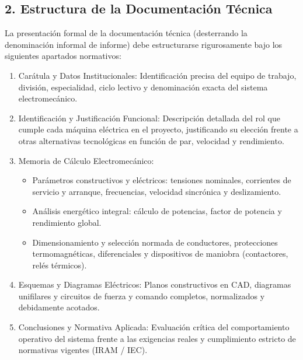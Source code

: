 \documentclass[../main]{subfiles}
\begin{document}
\subsection{2. Estructura de la Documentación Técnica}
La presentación formal de la documentación técnica (desterrando la
denominación informal de informe) debe estructurarse rigurosamente
bajo los siguientes apartados normativos:
\begin{enumerate}
  \item Carátula y Datos Institucionales: Identificación precisa del
    equipo de trabajo, división, especialidad, ciclo lectivo y
    denominación exacta del sistema electromecánico.
  \item Identificación y Justificación Funcional: Descripción
    detallada del rol que cumple cada máquina eléctrica en el
    proyecto, justificando su elección frente a otras alternativas
    tecnológicas en función de par, velocidad y rendimiento.
  \item Memoria de Cálculo Electromecánico:
    \begin{itemize}
      \item Parámetros constructivos y eléctricos: tensiones
        nominales, corrientes de servicio y arranque, frecuencias,
        velocidad sincrónica y deslizamiento.
      \item Análisis energético integral: cálculo de potencias,
        factor de potencia y rendimiento global.
      \item Dimensionamiento y selección normada de conductores,
        protecciones termomagnéticas, diferenciales y dispositivos de
        maniobra (contactores, relés térmicos).
    \end{itemize}
  \item Esquemas y Diagramas Eléctricos: Planos constructivos en CAD,
    diagramas unifilares y circuitos de fuerza y comando completos,
    normalizados y debidamente acotados.
  \item Conclusiones y Normativa Aplicada: Evaluación crítica del
    comportamiento operativo del sistema frente a las exigencias
    reales y cumplimiento estricto de normativas vigentes (IRAM / IEC).
\end{enumerate}
\end{document}

